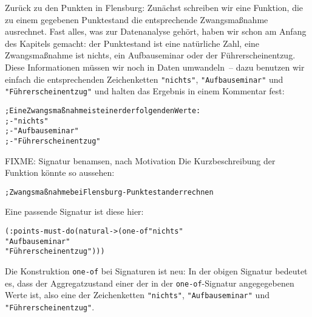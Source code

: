 Zurück zu den Punkten in Flensburg: Zunächst schreiben wir eine
Funktion, die zu einem gegebenen Punktestand die entsprechende
Zwangsmaßnahme ausrechnet.  Fast alles, was zur Datenanalyse gehört,
haben wir schon am Anfang des Kapitels gemacht: der Punktestand ist
eine natürliche Zahl, eine Zwangsmaßnahme ist nichts, ein
Aufbauseminar oder der Führerscheinentzug.  Diese Informationen müssen
wir noch in Daten umwandeln~-- dazu benutzen wir einfach die
entsprechenden Zeichenketten \verb|"nichts"|, \verb|"Aufbauseminar"|
und \verb|"Führerscheinentzug"| und halten das Ergebnis in einem
Kommentar fest:
%
\begin{alltt}
; Eine Zwangsmaßnahme ist einer der folgenden Werte:
; - "nichts"
; - "Aufbauseminar"
; - "Führerscheinentzug"
\end{alltt}
%
FIXME: Signatur benamsen, nach Motivation
%
Die Kurzbeschreibung der Funktion könnte so aussehen:
%
\begin{alltt}
; Zwangsmaßnahme bei Flensburg-Punktestand errechnen
\end{alltt}
%
Eine passende Signatur ist diese
hier:\label{page:points-must-do}
%
\begin{alltt}
(: points-must-do (natural -> (one-of "nichts"
                                      "Aufbauseminar"
                                      "Führerscheinentzug")))
\end{alltt}
%
Die Konstruktion \texttt{one-of}
bei Signaturen ist neu: In der obigen
Signatur bedeutet es, dass der Aggregatzustand einer der in der
\texttt{one-of}-Signatur angegegebenen Werte ist, also eine der
Zeichenketten \verb|"nichts"|, \verb|"Aufbauseminar"| und \verb|"Führerscheinentzug"|.


